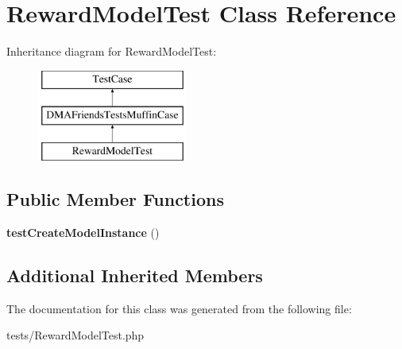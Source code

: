 \hypertarget{classRewardModelTest}{\section{Reward\-Model\-Test Class Reference}
\label{classRewardModelTest}
}
Inheritance diagram for Reward\-Model\-Test\-:\begin{figure}[H]
\begin{center}
\leavevmode
\includegraphics[height=3.000000cm]{d6/db2/classRewardModelTest}
\end{center}
\end{figure}
\subsection*{Public Member Functions}
\begin{DoxyCompactItemize}
\item 
\hypertarget{classRewardModelTest_a1cd6849edd74f2d1c1a1f2bd05382405}{{\bfseries test\-Create\-Model\-Instance} ()}\label{classRewardModelTest_a1cd6849edd74f2d1c1a1f2bd05382405}

\end{DoxyCompactItemize}
\subsection*{Additional Inherited Members}


The documentation for this class was generated from the following file\-:\begin{DoxyCompactItemize}
\item 
tests/Reward\-Model\-Test.\-php\end{DoxyCompactItemize}
